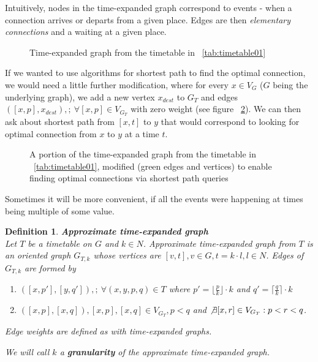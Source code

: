 \documentclass[a4paper]{article}
\newcommand{\inputTikZ}[1]{%
  }
\newcommand{\inputTikZ}[1]{%
    \beginpgfgraphicnamed{#1-external}%
    \endpgfgraphicnamed%
  }
\newtheorem{definition}{Definition}
\begin{document}
        \noindent Intuitively, nodes in the time-expanded graph correspond to events - when a connection arrives or departs from a given place. Edges are then \emph{elementary connections} and a waiting at a given place.

        \begin{figure}[h!]
            \scriptsize
            \begin{center}
                \inputTikZ{./tikzpics/timeexpanded}
            \end{center}
            \caption{\label{fig:timeexp01} Time-expanded graph from the timetable in ~\ref{tab:timetable01}}
        \end{figure}

        If we wanted to use algorithms for shortest path to find the optimal connection, we would need a little further modification, where for every $x \in V_{G}$ ($G$ being the underlying graph), we add a new vertex $x_{dest}$ to $G_{T}$ and edges $([x, p], x_{dest}), ;\ \forall [x, p] \in V_{G_{T}}$ with zero weight (see figure ~\ref{fig:shpathtimeexp}). We can then ask about shortest path from $[x, t]$ to $y$ that would correspond to looking for optimal connection from $x$ to $y$ at a time $t$.

        \begin{figure}[h!]
            \scriptsize
            \begin{center}
                \inputTikZ{./tikzpics/timeexpanded_search}
            \end{center}
            \caption{\label{fig:shpathtimeexp} A portion of the time-expanded graph from the timetable in ~\ref{tab:timetable01}, modified (green edges and vertices) to enable finding optimal connections via shortest path queries}
        \end{figure}

        Sometimes it will be more convenient, if all the events were happening at times being multiple of some value.

        \begin{definition}
            \textbf{Approximate time-expanded graph} \\ %
            Let $T$ be a timetable on $G$ and $k \in N$. Approximate time-expanded graph from $T$ is an oriented graph $G_{T, k}$ whose vertices are $[v, t], v \in G, t = k \cdot l, l \in N$. Edges of $G_{T, k}$ are formed by
            \begin{enumerate}
                \item $([x, p'], [y, q']), ;\ \forall (x, y, p, q) \in T$ where $p' = \lfloor \frac{p}{k} \rfloor \cdot k$ and $q' = \lceil \frac{q}{k} \rceil \cdot k$
                \item $([x, p], [x, q]), [x, p], [x, q] \in V_{G_{T}}, p < q$ and $\not \exists [x, r] \in V_{G_{T}}: p < r < q$.
            \end{enumerate}
            Edge weights are defined as with \emph{time-expanded graphs}.

            \noindent We will call $k$ a \textbf{granularity} of the approximate time-expanded graph.
        \end{definition}
\end{document}
